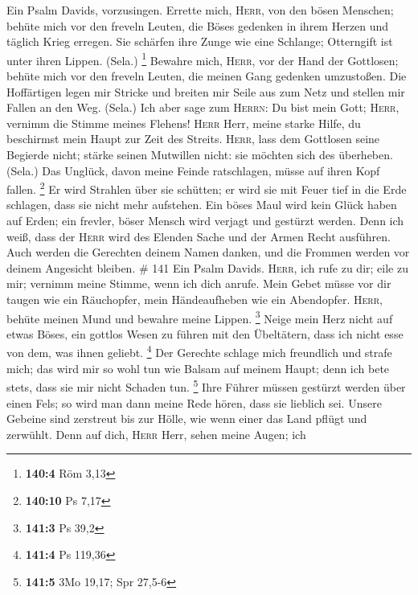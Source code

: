  Ein Psalm Davids, vorzusingen.  Errette
mich, \textsc{Herr}, von den bösen Menschen; behüte mich vor den freveln
Leuten,  die Böses gedenken in ihrem Herzen und täglich
Krieg erregen.  Sie schärfen ihre Zunge wie eine Schlange;
Otterngift ist unter ihren Lippen. (Sela.) \footnote{\textbf{140:4} Röm
  3,13}  Bewahre mich, \textsc{Herr}, vor der Hand der
Gottlosen; behüte mich vor den freveln Leuten, die meinen Gang gedenken
umzustoßen.  Die Hoffärtigen legen mir Stricke und breiten
mir Seile aus zum Netz und stellen mir Fallen an den Weg. (Sela.)
 Ich aber sage zum \textsc{Herrn}: Du bist mein Gott;
\textsc{Herr}, vernimm die Stimme meines Flehens! 
\textsc{Herr} Herr, meine starke Hilfe, du beschirmst mein Haupt zur
Zeit des Streits.  \textsc{Herr}, lass dem Gottlosen seine
Begierde nicht; stärke seinen Mutwillen nicht: sie möchten sich des
überheben. (Sela.)  Das Unglück, davon meine Feinde
ratschlagen, müsse auf ihren Kopf fallen. \footnote{\textbf{140:10} Ps
  7,17}  Er wird Strahlen über sie schütten; er wird sie
mit Feuer tief in die Erde schlagen, dass sie nicht mehr aufstehen.
 Ein böses Maul wird kein Glück haben auf Erden; ein
frevler, böser Mensch wird verjagt und gestürzt werden. 
Denn ich weiß, dass der \textsc{Herr} wird des Elenden Sache und der
Armen Recht ausführen.  Auch werden die Gerechten deinem
Namen danken, und die Frommen werden vor deinem Angesicht bleiben. \#
141  Ein Psalm Davids. \textsc{Herr}, ich rufe zu dir;
eile zu mir; vernimm meine Stimme, wenn ich dich anrufe. 
Mein Gebet müsse vor dir taugen wie ein Räuchopfer, mein Händeaufheben
wie ein Abendopfer.  \textsc{Herr}, behüte meinen Mund und
bewahre meine Lippen. \footnote{\textbf{141:3} Ps 39,2} 
Neige mein Herz nicht auf etwas Böses, ein gottlos Wesen zu führen mit
den Übeltätern, dass ich nicht esse von dem, was ihnen geliebt.
\footnote{\textbf{141:4} Ps 119,36}  Der Gerechte schlage
mich freundlich und strafe mich; das wird mir so wohl tun wie Balsam auf
meinem Haupt; denn ich bete stets, dass sie mir nicht Schaden tun.
\footnote{\textbf{141:5} 3Mo 19,17; Spr 27,5-6}  Ihre
Führer müssen gestürzt werden über einen Fels; so wird man dann meine
Rede hören, dass sie lieblich sei.  Unsere Gebeine sind
zerstreut bis zur Hölle, wie wenn einer das Land pflügt und zerwühlt.
 Denn auf dich, \textsc{Herr} Herr, sehen meine Augen; ich
